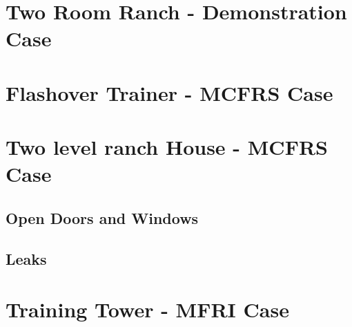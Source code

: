 \documentclass[11pt]{book}
\newcommand{\fdsinput}[1]{
{
\scriptsize

}
}
\begin{document}
\section{Two Room Ranch - Demonstration Case}
\fdsinput{Demonstrations/2Room_Ranch/ranch_00.fds}

\section{Flashover Trainer - MCFRS Case}
\fdsinput{MCFRS/MCFRS_Flashover/MCFRS_Flashover_00.fds}

\section{Two level ranch House - MCFRS Case}
\subsection{Open Doors and Windows}
\fdsinput{MCFRS/MCFRS_Tower/MCFRS_Tower_00.fds}

\subsection{Leaks}
\fdsinput{MCFRS/MCFRS_Tower/MCFRS_Tower_01.fds}

\section{Training Tower - MFRI Case}
\fdsinput{MFRI/MFRI_Training_Tower/MFRI_Training_Tower_01_avg.fds}
\end{document}

